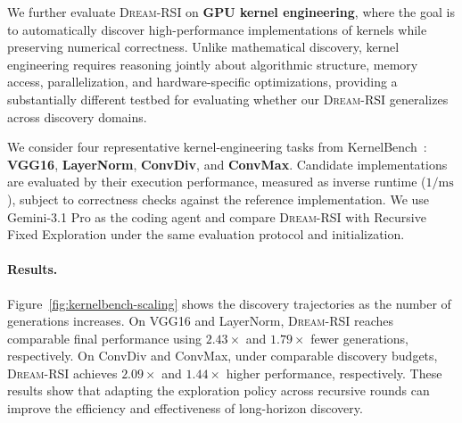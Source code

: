 We further evaluate \textsc{Dream-RSI} on \textbf{GPU kernel engineering}, where the goal is to automatically discover high-performance implementations of kernels while preserving numerical correctness. Unlike mathematical discovery, kernel engineering requires reasoning jointly about algorithmic structure, memory access, parallelization, and hardware-specific optimizations, providing a substantially different testbed for evaluating whether our \textsc{Dream-RSI} generalizes across discovery domains.

We consider four representative kernel-engineering tasks from KernelBench~\citep{ouyang2025kernelbench}: \textbf{VGG16}, \textbf{LayerNorm}, \textbf{ConvDiv}, and \textbf{ConvMax}. Candidate implementations are evaluated by their execution performance, measured as inverse runtime ($1/\mathrm{ms}$), subject to correctness checks against the reference implementation. We use Gemini-3.1 Pro as the coding agent and compare \textsc{Dream-RSI} with Recursive Fixed Exploration under the same evaluation protocol and initialization.

\paragraph{Results.}
Figure~\ref{fig:kernelbench-scaling} shows the discovery trajectories as the number of generations increases.
On VGG16 and LayerNorm, \textsc{Dream-RSI} reaches comparable final performance using
$2.43\times$ and $1.79\times$ fewer generations, respectively.
On ConvDiv and ConvMax, under comparable discovery budgets,
\textsc{Dream-RSI} achieves $2.09\times$ and $1.44\times$ higher performance, respectively.
These results show that adapting the exploration policy across recursive rounds can improve the efficiency and effectiveness of long-horizon discovery.





